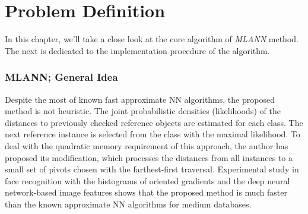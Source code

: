 \chapter{Problem Definition}

In this chapter, we'll take a close look at the core algorithm of \textit{MLANN} method. The next is dedicated to the implementation procedure of the algorithm.

\subsection{MLANN; General Idea} 
Despite the most of known fast approximate NN algorithms, the proposed method is not heuristic. The joint probabilistic densities (likelihoods) of the distances to previously checked reference objects are estimated for each class. The next reference instance is selected from the class with the maximal likelihood. To deal with the quadratic memory requirement of this approach, the author has proposed its modification, which processes the distances from all instances to a small set of pivots chosen with the farthest-first traversal. Experimental study in face recognition with the histograms of oriented gradients and the deep neural network-based image features shows that the proposed method is much faster than the known approximate NN algorithms for medium databases.

